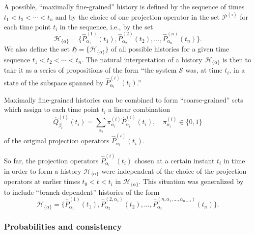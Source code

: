 \documentclass[twocolumn,rmp,aps,amsmath,amsfonts,noshowkeys,noshowpacs]{revtex4}
\begin{document}
A possible, ``maximally fine-grained'' history is defined by the
sequence of times $t_1 < t_2 < \cdots < t_n$ and by the choice of one
projection operator in the set $\mathcal{P}^{(i)}$ for each time point
$t_i$ in the sequence, i.e., by the set
%
\begin{equation} \label{eq:hist-fine}
\mathcal{H}_{\{\alpha\}} = \{
\widehat{P}^{(1)}_{\alpha_1}(t_1), \widehat{P}^{(2)}_{\alpha_2}(t_2),
\dots, \widehat{P}^{(n)}_{\alpha_n}(t_n) \}.  
\end{equation}
%
We also define the set $\mathfrak{H}= \{\mathcal{H}_{\{\alpha\}} \}$
of all possible histories for a given time sequence $t_1 < t_2 <
\cdots < t_n$. The natural interpretation of a history
$\mathcal{H}_{\{\alpha\}}$ is then to take it as a series of
propositions of the form ``the system $\mathcal{S}$ was, at time
$t_i$, in a state of the subspace spanned by
$\widehat{P}^{(i)}_{\alpha_i}(t_i)$.''

Maximally fine-grained histories can be combined to form
``coarse-grained'' sets which assign to each time point $t_i$ a linear
combination
%
\begin{equation} 
\widehat{Q}^{(i)}_{\beta_i}(t_i) = \sum_{\alpha_i} \pi^{(i)}_{\alpha_i}
\widehat{P}^{(i)}_{\alpha_i}(t_i), \quad \pi^{(i)}_{\alpha_i} \in \{0,1\} 
\end{equation}
%
of the original projection operators $\widehat{P}^{(i)}_{\alpha_i}(t_i)$.

So far, the projection operators $\widehat{P}^{(i)}_{\alpha_i}(t_i)$
chosen at a certain instant $t_i$ in time in order to form a history
$\mathcal{H}_{\{\alpha\}}$ were independent of the choice of the
projection operators at earlier times $t_0 < t < t_i$ in
$\mathcal{H}_{\{\alpha\}}$. This situation was generalized by
\citet{Omnes:1988:lz,Omnes:1988:lq,Omnes:1988:zg,Omnes:1990:ww,Omnes:1992:gy}
to include ``branch-dependent'' histories of the form \citep[see
also][]{GellMann:1993:oi}
%
\begin{equation} \label{eq:hist-fine-branch}
\mathcal{H}_{\{\alpha\}} = \{
\widehat{P}^{(1)}_{\alpha_1}(t_1), \widehat{P}^{(2,\alpha_1)}_{\alpha_2}(t_2),
\dots, \widehat{P}^{(n,\alpha_1,\hdots,\alpha_{n-1})}_{\alpha_n}(t_n) \}.  
\end{equation}
%


\subsubsection{Probabilities and consistency} 
\end{document}
